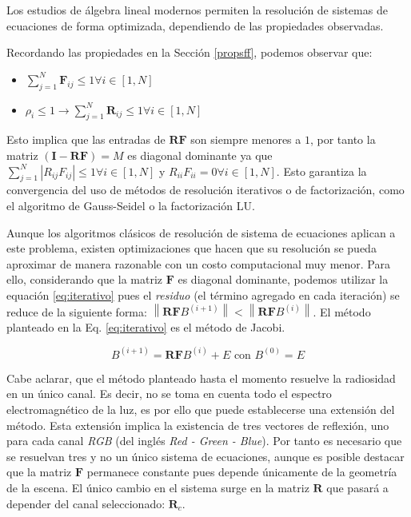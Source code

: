Los estudios de álgebra lineal modernos permiten la resolución de sistemas de ecuaciones de forma optimizada, dependiendo de las propiedades observadas.

Recordando las propiedades en la Sección \ref{propsff}, podemos observar que:

\begin{itemize}
	\item $\sum_{j=1}^{N} \mathbf{F}_{ij} \leq 1 \forall{i \in [1,N]}$
	\item $\rho_{i} \leq 1 \rightarrow \sum_{j=1}^{N} \mathbf{R}_{ij} \leq 1 \forall{i \in [1,N]}$
\end{itemize}

Esto implica que las entradas de $\mathbf{RF}$ s\texttt{}on siempre menores a $1$, por tanto la matriz $(\mathbf{I} - \mathbf{RF}) = M$ es diagonal dominante ya que $\sum_{j=1}^{N}|R_{ij}F_{ij}| \le 1 \forall i \in [1, N]$ y $R_{ii}F_{ii} = 0  \forall  i \in [1,N]$. Esto garantiza la convergencia del uso de métodos de resolución iterativos o de factorización, como el algoritmo de Gauss-Seidel o la factorización LU.

Aunque los algoritmos clásicos de resolución de sistema de ecuaciones aplican a este problema, existen optimizaciones que hacen que su resolución se pueda aproximar de manera razonable con un costo computacional muy menor. Para ello, considerando que la matriz $\mathbf{F}$ es diagonal dominante, podemos utilizar la equación \ref{eq:iterativo} pues el \textit{residuo} (el término agregado en cada iteración) se reduce de la siguiente forma: $\left\|\mathbf{RF}B^{(i+1)}\right\| < \left\|\mathbf{RF}B^{(i)}\right\|$. El método planteado en la Eq. \eqref{eq:iterativo} es el método de Jacobi.

\begin{equation}
	B^{(i+1)}  = \mathbf{RF}B^{(i)}  + E \text{ con }  B^{(0)} = E
	\label{eq:iterativo}
\end{equation}

Cabe aclarar, que el método planteado hasta el momento resuelve la radiosidad en un único canal. Es decir, no se toma en cuenta todo el espectro electromagnético de la luz, es por ello que puede establecerse una extensión del método. Esta extensión implica la existencia de tres vectores de reflexión, uno para cada canal \textit{RGB} (del inglés \textit{Red - Green - Blue}). Por tanto es necesario que se resuelvan tres y no un único sistema de ecuaciones, aunque es posible destacar que la matriz $\mathbf{F}$ permanece constante pues depende únicamente de la geometría de la escena. El único cambio en el sistema surge en la matriz $\mathbf{R}$ que pasará a depender del canal seleccionado: $\mathbf{R}_{c}$.

